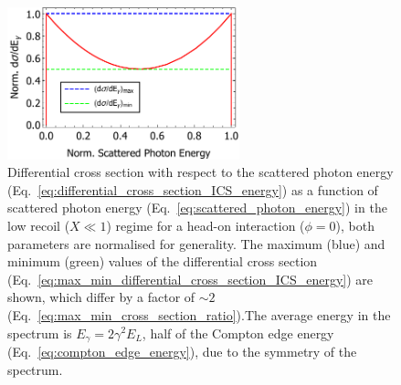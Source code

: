 \documentclass[../main.tex]{subfiles}
\begin{document}
\begin{figure}[!h]
\centering
\includegraphics[width=0.6\textwidth]{Figures/Photon_Production_by_Inverse_Compton_Scattering/Cross_Section_Scattered_Photon_Energy.pdf}
\caption{Differential cross section with respect to the scattered photon energy (Eq.~\ref{eq:differential_cross_section_ICS_energy}) as a function of scattered photon energy (Eq.~\ref{eq:scattered_photon_energy}) in the low recoil ($X \ll 1$) regime for a head-on interaction ($\phi=0$), both parameters are normalised for generality. The maximum (blue) and minimum (green) values of the differential cross section (Eq.~\ref{eq:max_min_differential_cross_section_ICS_energy}) are shown, which differ by a factor of $\sim2$ (Eq.~\ref{eq:max_min_cross_section_ratio}).The average energy in the spectrum is $E_{\gamma}=2\gamma^{2}E_{L}$, half of the Compton edge energy (Eq.~\ref{eq:compton_edge_energy}), due to the symmetry of the spectrum.}
\label{fig:cross_section_scattered_photon_energy}
\end{figure}
\end{document}
